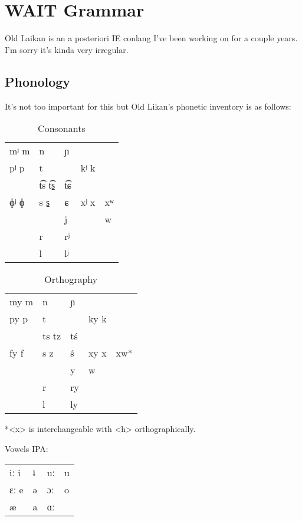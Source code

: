 \documentclass[11pt,a4paper]{article}
\begin{document}
\section{{\bfseries\sffamily WAIT} Grammar}
\label{sec:org12dba6d}
Old Laikan is an a posteriori IE conlang I've been working on for a couple years.
I'm sorry it's kinda very irregular.

\subsection{Phonology}
\label{sec:orge53f54d}
It's not too important for this but Old Likan's phonetic inventory is as follows:

\begin{table}[htbp]
\caption{Consonants}
\centering
\begin{tabular}{lllll}
mʲ m & n & ɲ &  & \\
pʲ p & t &  & kʲ k & \\
 & t͡s t͡s̠ & t͡ɕ &  & \\
ɸʲ ɸ & s  s̠ & ɕ & xʲ x & xʷ\\
 &  & j &  & w\\
 & r & rʲ &  & \\
 & l & lʲ &  & \\
\end{tabular}
\end{table}

\begin{table}[htbp]
\caption{Orthography}
\centering
\begin{tabular}{lllll}
my m & n & ɲ &  & \\
py p & t &  & ky k & \\
 & ts tz & tś &  & \\
fy f & s  z & ś & xy x & xw*\\
 &  & y & w & \\
 & r & ry &  & \\
 & l & ly &  & \\
\end{tabular}
\end{table}

*<x> is interchangeable with <h> orthographically.

Vowels
IPA:
\begin{center}
\begin{tabular}{llll}
iː i & ɨ & uː & u\\
ɛː e & ə & ɔː & o\\
æ & a & ɑː & \\
\end{tabular}
\end{center}
\end{document}
